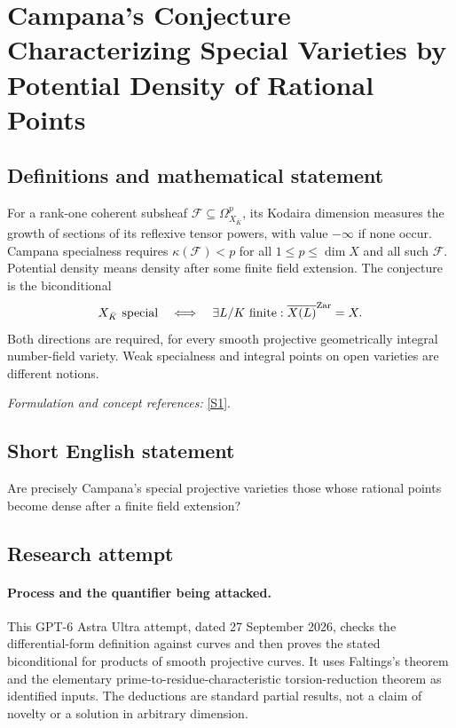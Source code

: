 \documentclass[11pt]{article}
\begin{document}
\section*{\texorpdfstring{Campana's Conjecture Characterizing Special Varieties by Potential Density of Rational Points}{Campana's Conjecture Characterizing Special Varieties by Potential Density of Rational Points}}\label{statement}
\subsection{Definitions and mathematical statement}
For a rank-one coherent subsheaf $\mathcal F\subseteq\Omega^p_{X_{\bar K}}$, its Kodaira dimension measures the growth of sections of its reflexive tensor powers, with value $-\infty$ if none occur. Campana specialness requires $\kappa(\mathcal F)<p$ for all $1\le p\le\dim X$ and all such $\mathcal F$. Potential density means density after some finite field extension. The conjecture is the biconditional
\[
 X_{\bar K}\text{ special}\quad\Longleftrightarrow\quad
 \exists L/K\text{ finite}:\overline{X(L)}^{\rm Zar}=X.
\]
Both directions are required, for every smooth projective geometrically integral number-field variety. Weak specialness and integral points on open varieties are different notions.
\par\smallskip\textit{Formulation and concept references:} \href{https://arxiv.org/pdf/math/0701105}{[S1]}.

\subsection{Short English statement}
Are precisely Campana's special projective varieties those whose rational points become dense after a finite field extension?
\subsection{Research attempt}
\paragraph{Process and the quantifier being attacked.}
This GPT-6 Astra Ultra attempt, dated 27 September 2026, checks the differential-form definition against curves and then proves the stated biconditional for products of smooth projective curves. It uses Faltings's theorem and the elementary prime-to-residue-characteristic torsion-reduction theorem as identified inputs. The deductions are standard partial results, not a claim of novelty or a solution in arbitrary dimension.
\end{document}
